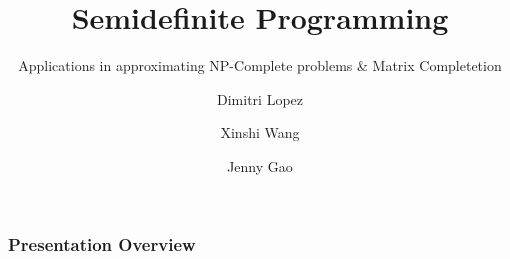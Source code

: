\documentclass[
	11pt, %
]{beamer}
\title[Semidefinite Programming]{Semidefinite Programming} %
\subtitle{Applications in approximating NP-Complete problems \& Matrix Completetion} %
\author[]{Dimitri Lopez \and Xinshi Wang \and Jenny Gao} %
\institute[RPI]{Rensselaer Polytechnic Institute} %
\begin{document}

\begin{frame}
	\titlepage %
\end{frame}



\begin{frame}
	\frametitle{Presentation Overview} %

	\tableofcontents %
\end{frame}

\end{document}
